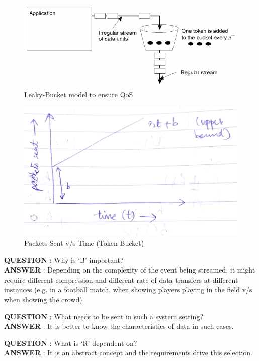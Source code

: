 \documentclass[twoside]{article}
\begin{document}
\begin{figure}[h!]
\includegraphics[scale=0.5]{Selection_007}
\centering
\caption{Leaky-Bucket model to ensure QoS}
\end{figure}

\begin{figure}[h!]
\includegraphics[scale=0.15]{Class_Diagram_2}
\centering
\caption{Packets Sent v/s Time (Token Bucket)}
\end{figure}


\textbf{QUESTION} : Why is `B' important? \\
\textbf{ANSWER} : Depending on the complexity of the event being streamed, it might require different compression and different rate of data transfers at different instances (e.g. in a football match, when showing players playing in the field v/s when showing the crowd)

\textbf{QUESTION} : What needs to be sent in such a system setting? \\
\textbf{ANSWER} : It is better to know the characteristics of data in such cases.

\textbf{QUESTION} : What is `R' dependent on? \\
\textbf{ANSWER} : It is an abstract concept and the requirements drive this selection.
\end{document}
